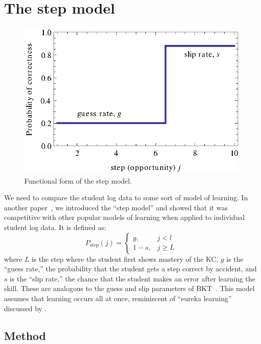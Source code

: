 \documentclass{edm_template}
\begin{document}
\section{The step model}

\begin{figure}
  \centering \includegraphics{step-model.eps}
  \caption{Functional form of the step model.}
    \label{step-model}
\end{figure}

We need to compare the student log data to some sort of model
of learning.  In another paper~\cite{van_de_sande_applying_2013},
we introduced the ``step model'' and showed that it was 
competitive with other popular models of learning when applied
to individual student log data.  It is defined as:
%
\begin{equation}
    P_\mathrm{step}(j)= \left\{\begin{array}{cc}
                 g, & j<l \\
                 1-s, & j\ge L 
                 \end{array} \right. 
\end{equation}
%
where $L$ is the step where the student first shows mastery of the KC,
$g$ is the ``guess rate,'' the probability that the student gets a
step correct by accident, and $s$ is the ``slip rate,'' the chance
that the student makes an error after learning the skill.  These are
analogous to the guess and slip parameters of
BKT~\cite{corbett_knowledge_1995}.  This model assumes that learning 
occurs all at once, reminiscent of ``eureka learning''
discussed by \cite{baker_detecting_2011}.

\subsection{Method}
\end{document}
